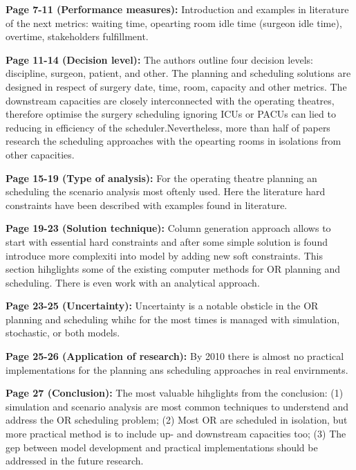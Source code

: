     \textbf{Page 7-11 (Performance measures):}
    Introduction and examples in literature of the next metrics: waiting time, opearting room idle time (surgeon idle time), overtime, stakeholders fulfillment.
    
    \textbf{Page 11-14 (Decision level):}
    The authors outline four decision levels: discipline, surgeon, patient, and other. The planning and scheduling solutions are designed in respect of surgery date, time, room, capacity and other metrics. The downstream capacities are closely interconnected with the operating theatres, therefore optimise the surgery scheduling ignoring ICUs or PACUs can lied to reducing in efficiency of the scheduler.Nevertheless, more than half of papers research the scheduling approaches with the opearting rooms in isolations from other capacities.  
    
    \textbf{Page 15-19 (Type of analysis):}
    For the operating theatre planning an scheduling the scenario analysis most oftenly used. Here the literature hard constraints have been described with examples found in literature. 

    \textbf{Page 19-23 (Solution technique):}
    Column generation approach allows to start with essential hard constraints and after some simple solution is found introduce more complexiti into model by adding new soft constraints. This section hihglights some of the existing computer methods for OR planning and scheduling. There is even work with an analytical approach.

    \textbf{Page 23-25 (Uncertainty):}
    Uncertainty is a notable obsticle in the OR planning and scheduling whihc for the most times is managed with simulation, stochastic, or both models.
    
    \textbf{Page 25-26 (Application of research):}
    By 2010 there is almost no practical implementations for the planning ans scheduling approaches in real envirnments.
    
    \textbf{Page 27 (Conclusion):}
    The most valuable hihglights from the conclusion: (1) simulation and scenario analysis are most common techniques to understend and address the OR scheduling problem; (2) Most OR are scheduled in isolation, but more practical method is to include up- and downstream capacities too; (3) The gep between model development and practical implementations should be addressed in the future research. 